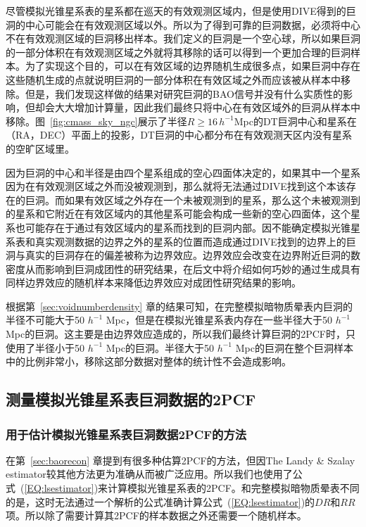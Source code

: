 {尽管模拟光锥星系表的星系都在巡天的有效观测区域内，但是使用DIVE得到的巨洞的中心可能会在有效观测区域以外。所以为了得到可靠的巨洞数据，必须将中心不在有效观测区域的巨洞移出样本。我们定义的巨洞是一个空心球，所以如果巨洞的一部分体积在有效观测区域之外就将其移除的话可以得到一个更加合理的巨洞样本。为了实现这个目的，可以在有效区域的边界随机生成很多点，如果巨洞中存在这些随机生成的点就说明巨洞的一部分体积在有效区域之外而应该被从样本中移除。但是，我们发现这样做的结果对研究巨洞的BAO信号并没有什么实质性的影响，但却会大大增加计算量，因此我们最终只将中心在有效区域外的巨洞从样本中移除。图~\ref{fig:cmass_sky_ngc}展示了半径$R \geq 16\,h^{-1}$Mpc的DT巨洞中心和星系在（RA，DEC）平面上的投影，DT巨洞的中心都分布在有效观测天区内没有星系的空旷区域里。

因为巨洞的中心和半径是由四个星系组成的空心四面体决定的，如果其中一个星系因为在有效观测区域之外而没被观测到，那么就将无法通过DIVE找到这个本该存在的巨洞。而如果有效区域之外存在一个未被观测到的星系，那么这个未被观测到的星系和它附近在有效区域内的其他星系可能会构成一些新的空心四面体，这个星系也可能存在于通过有效区域内的星系而找到的巨洞内部。因不能确定模拟光锥星系表和真实观测数据的边界之外的星系的位置而造成通过DIVE找到的边界上的巨洞与真实的巨洞存在的偏差被称为边界效应。边界效应会改变在边界附近巨洞的数密度从而影响到巨洞成团性的研究结果，在后文中将介绍如何巧妙的通过生成具有同样边界效应的随机样本来降低边界效应对成团性研究结果的影响。

根据第~\ref{sec:voidnumberdensity} 章的结果可知，在完整模拟暗物质晕表内巨洞的半径不可能大于50 $h^{-1}$ Mpc，但是在模拟光锥星系表内存在一些半径大于50 $h^{-1}$ Mpc的巨洞。这主要是由边界效应造成的，所以我们最终计算巨洞的2PCF时，只使用了半径小于50 $h^{-1}$ Mpc的巨洞。半径大于50 $h^{-1}$ Mpc的巨洞在整个巨洞样本中的比例非常小，移除这部分数据对整体的统计性不会造成影响。

\subsection{测量模拟光锥星系表巨洞数据的2PCF}
\label{sec:lc2pcf}
\subsubsection{用于估计模拟光锥星系表巨洞数据2PCF的方法}
\label{sec:lclzest}

在第~\ref{sec:baorecon} 章提到有很多种估算2PCF的方法，但因The Landy \& Szalay estimator较其他方法更为准确从而被广泛应用。所以我们也使用了公式~(\ref{EQ:lsestimator})来计算模拟光锥星系表的2PCF。和完整模拟暗物质晕表不同的是，这时无法通过一个解析的公式准确计算公式~(\ref{EQ:lsestimator})的$DR$和$RR$项。所以除了需要计算其2PCF的样本数据之外还需要一个随机样本。

}
